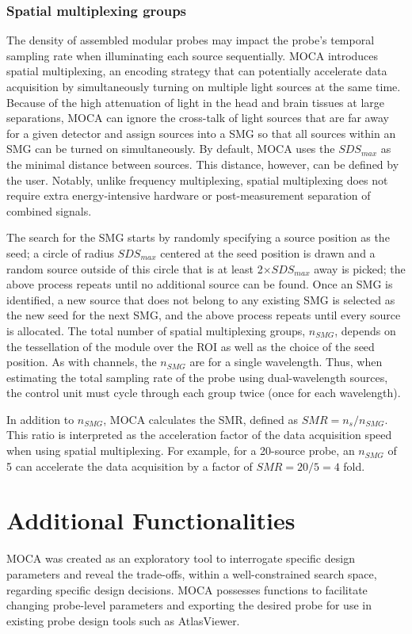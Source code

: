 \subsubsection{Spatial multiplexing groups}
The density of assembled modular probes may impact the probe's temporal sampling rate when illuminating each source sequentially. \ac{MOCA} introduces spatial multiplexing, an encoding strategy that can potentially accelerate data acquisition by simultaneously turning on multiple light sources at the same time. Because of the high attenuation of light in the head and brain tissues at large separations, \ac{MOCA} can ignore the cross-talk of light sources that are far away for a given detector and assign sources into a \ac{SMG} so that all sources within an \ac{SMG} can be turned on simultaneously. By default, \ac{MOCA} uses the $SDS_{max}$ as the minimal distance between sources. This distance, however, can be defined by the user. Notably, unlike frequency multiplexing, spatial multiplexing does not require extra energy-intensive hardware or post-measurement separation of combined signals. 

The search for the \ac{SMG} starts by randomly specifying a source position as the seed; a circle of radius $SDS_{max}$ centered at the seed position is drawn and a random source outside of this circle that is at least 2$\times SDS_{max}$ away is picked; the above process repeats until no additional source can be found. Once an \ac{SMG} is identified, a new source that does not belong to any existing \ac{SMG} is selected as the new seed for the next \ac{SMG}, and the above process repeats until every source is allocated. The total number of spatial multiplexing groups, $n_{SMG}$, depends on the tessellation of the module over the \ac{ROI} as well as the choice of the seed position. As with channels, the $n_{SMG}$ are for a single wavelength. Thus, when estimating the total sampling rate of the probe using dual-wavelength sources, the control unit must cycle through each group twice (once for each wavelength).

In addition to $n_{SMG}$, \ac{MOCA} calculates the \ac{SMR}, defined as $SMR=n_s/n_{SMG}$. This ratio is interpreted as the acceleration factor of the data acquisition speed when using spatial multiplexing. For example, for a 20-source probe, an $n_{SMG}$ of 5 can accelerate the data acquisition by a factor of $SMR=20/5=4$ fold.



\section{Additional Functionalities}
\label{chap:moca:features}
\ac{MOCA} was created as an exploratory tool to interrogate specific design parameters and reveal the trade-offs, within a well-constrained search space, regarding specific design decisions. \ac{MOCA} possesses functions to facilitate changing probe-level parameters and exporting the desired probe for use in existing probe design tools such as AtlasViewer.

